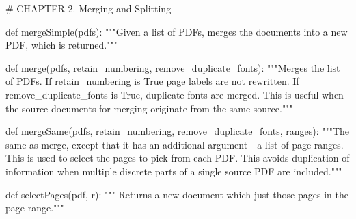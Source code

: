 # CHAPTER 2. Merging and Splitting

def mergeSimple(pdfs):
    """Given a list of PDFs, merges the documents into a new PDF, which is
    returned."""

def merge(pdfs, retain_numbering, remove_duplicate_fonts):
    """Merges the list of PDFs. If retain_numbering is True page labels are not
    rewritten. If remove_duplicate_fonts is True, duplicate fonts are merged.
    This is useful when the source documents for merging originate from the
    same source."""

def mergeSame(pdfs, retain_numbering, remove_duplicate_fonts, ranges):
    """The same as merge, except that it has an additional argument
    - a list of page ranges. This is used to select the pages to pick from
    each PDF. This avoids duplication of information when multiple discrete
    parts of a single source PDF are included."""

def selectPages(pdf, r):
    """ Returns a new document which just those pages in the page range."""
